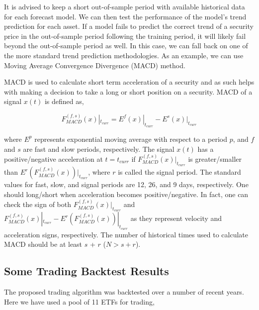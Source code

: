 \documentclass{article}
\begin{document}
It is advised to keep a short out-of-sample period with available
historical data for each forecast model. We can then test the
performance of the model's trend prediction for each asset. If a model
fails to predict the correct trend of a security price in the
out-of-sample period following the training period, it will likely
fail beyond the out-of-sample period as well. In this case, we can
fall back on one of the more standard trend prediction
methodologies. As an example, we can use Moving Average Convergence
Divergence (MACD) method.

MACD is used to calculate short term acceleration of a security and as
such helps with making a decision to take a long or short position on
a security. MACD of a signal $x(t)$ is defined as,

\begin{equation}\label{eqn:macd}
F_{MACD}^{(f,s)}(x)|_{t_{curr}} = E^{f}(x)|_{t_{curr}} -
E^{s}(x)|_{t_{curr}}
\end{equation}

where $E^{p}$ represents exponential moving average with respect to a
period $p$, and $f$ and $s$ are fast and slow periods,
respectively. The signal $x(t)$ has a positive/negative acceleration
at $t=t_{curr}$ if $F_{MACD}^{(f,s)}(x)|_{t_{curr}}$ is
greater/smaller than $E^{r}(F_{MACD}^{(f,s)}(x))|_{t_{curr}}$, where
$r$ is called the signal period. The standard values for fast, slow,
and signal periods are 12, 26, and 9 days, respectively. One should
long/short when acceleration becomes positive/negative. In fact, one
can check the sign of both $F_{MACD}^{(f,s)}(x)|_{t_{curr}}$ and
$F_{MACD}^{(f,s)}(x)|_{t_{curr}}-E^{r}(F_{MACD}^{(f,s)}(x))|_{t_{curr}}$
as they represent velocity and acceleration signs, respectively. The
number of historical times used to calculate MACD should be at least
$s$ + $r$ ($N > s + r$).

\subsection{Some Trading Backtest Results}\label{subsection:trading-backtest}

The proposed trading algorithm was backtested over a number of recent
years. Here we have used a pool of 11 ETFs for trading,
\end{document}
